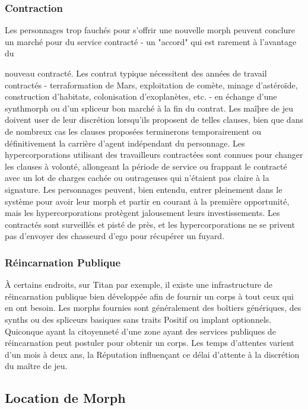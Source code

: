 \subsubsection{Contraction} 

Les personnages trop fauchés pour s'offrir une nouvelle morph peuvent conclure un marché pour du service contracté - un "accord" qui est rarement à l'avantage du 

nouveau contracté. Les contrat typique nécessitent des années de travail contractés - terraformation de Mars, exploitation de comète, minage d'astéroïde, construction d'habitats, colonisation d'exoplanètes, etc. - en échange d'une synthmorph ou d'un spliceur bon marché à la fin du contrat. Les maîþre de jeu doivent user de leur discrétion lorsqu'ils proposent de telles clauses, bien que dans de nombreux cas les clauses proposées terminerons temporairement ou définitivement la carrière d'agent indépendant du personnage. Les hypercorporations utilisant des travailleurs contractées sont connues pour changer les clauses à volonté, allongeant la période de service ou frappant le contracté avec un lot de charges cachée ou outrageuses qui n'étaient pas claire à la signature. Les personnages peuvent, bien entendu, entrer pleinement dans le système pour avoir leur morph et partir en courant à la première opportunité, mais les hypercorporations protègent jalousement leurs investissements. Les contractés sont surveillés et pisté de près, et les hypercorporations ne se privent pas d'envoyer des chasseurd d'ego pour récupérer un fuyard. 

\subsubsection{Réincarnation Publique} 

À certains endroits, sur Titan par exemple, il existe une infrastructure de réincarnation publique bien développée afin de fournir un corps à tout ceux qui en ont besoin. Les morphs fournies sont généralement des boîtiers génériques, des synths ou des spliceurs basiques sans traits Positif ou implant optionnels. Quiconque ayant la citoyenneté d'une zone ayant des services publiques de réincarnation peut postuler pour obtenir un corps. Les temps d'attentes varient d'un mois à deux ans,  la Réputation influençant ce délai d'attente à la discrétion du maître de jeu. 

\subsection{Location de Morph} 

